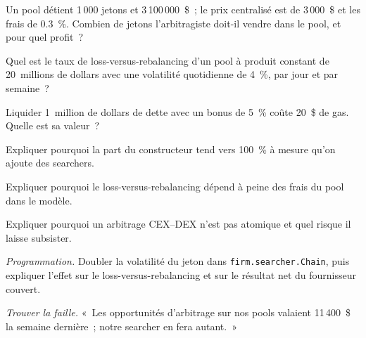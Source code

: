 \begin{exercise}[$\star$]\label{exo:hf:on-chain-trading:1}
Un pool détient 1\,000 jetons et 3\,100\,000~\$~; le prix centralisé est de 3\,000~\$ et les frais de 0.3~\%. Combien de jetons l'arbitragiste doit-il vendre dans
le pool, et pour quel profit~?
\end{exercise}

\begin{exercise}[$\star$]\label{exo:hf:on-chain-trading:2}
Quel est le taux de loss-versus-rebalancing d'un pool à produit constant de 20~millions de dollars avec une volatilité quotidienne de 4~\%, par jour et par semaine~?
\end{exercise}

\begin{exercise}[$\star$]\label{exo:hf:on-chain-trading:3}
Liquider 1~million de dollars de dette avec un bonus de 5~\% coûte 20~\$ de gas. Quelle est sa valeur~?
\end{exercise}

\begin{exercise}[$\star\star$]\label{exo:hf:on-chain-trading:4}
Expliquer pourquoi la part du constructeur tend vers 100~\% à mesure qu'on ajoute des searchers.
\end{exercise}

\begin{exercise}[$\star\star$]\label{exo:hf:on-chain-trading:5}
Expliquer pourquoi le loss-versus-rebalancing dépend à peine des frais du pool dans le modèle.
\end{exercise}

\begin{exercise}[$\star\star$]\label{exo:hf:on-chain-trading:6}
Expliquer pourquoi un arbitrage CEX--DEX n'est pas atomique et quel risque il laisse subsister.
\end{exercise}

\begin{exercise}[$\star\star\star$]\label{exo:hf:on-chain-trading:7}
\emph{Programmation.} Doubler la volatilité du jeton dans \texttt{firm.searcher.Chain}, puis expliquer l'effet sur le loss-versus-rebalancing et sur le résultat net du fournisseur couvert.
\end{exercise}

\begin{exercise}[$\star\star\star$]\label{exo:hf:on-chain-trading:8}
\emph{Trouver la faille.} «~Les opportunités d'arbitrage sur nos pools valaient 11\,400~\$ la semaine dernière~; notre searcher en fera autant.~»
\end{exercise}

